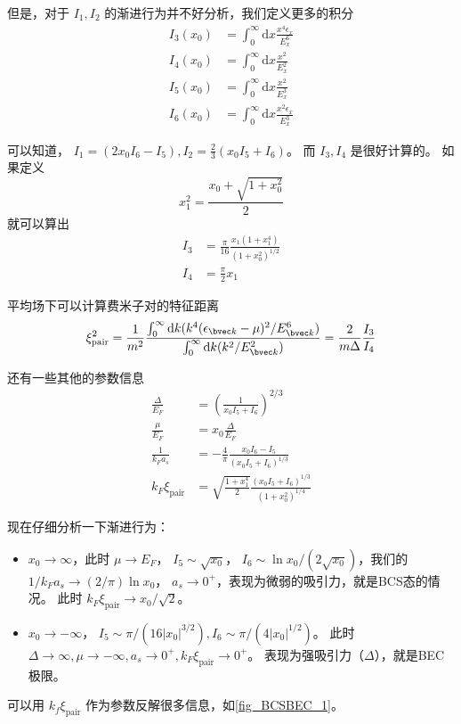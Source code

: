 但是，对于 $I_1, I_2$ 的渐进行为并不好分析，我们定义更多的积分
\begin{equation}
\begin{aligned}
I_3(x_0) &=\int_0^\infty\text{d}x\frac{x^4\epsilon_x}{E_x^6}\\
I_4(x_0) &=\int_0^\infty\text{d}x\frac{x^2}{E_x^2}\\
I_5(x_0) &=\int_0^\infty\text{d}x\frac{x^2}{E_x^3}\\
I_6(x_0) &=\int_0^\infty\text{d}x\frac{x^2\epsilon_x}{E_x^3}
\end{aligned}
\end{equation}

可以知道， $I_1=(2x_0I_6-I_5),I_2 = \frac{2}{3}(x_0I_5+I_6)$。 而 $I_3,I_4$ 是很好计算的。 如果定义
\begin{equation}
x_1^2=\frac{x_0+\sqrt{1+x_0^2}}{2}
\end{equation}
就可以算出
\begin{equation}
\begin{aligned}
I_3&=\frac{\pi}{16}\frac{x_1(1+x_1^4)}{(1+x_0^2)^{1/2}}\\
I_4&=\frac{\pi}{2}x_1
\end{aligned}
\end{equation}

平均场下可以计算费米子对的特征距离
\begin{equation}
\xi_{\text{pair}}^2 = \frac{1}{m^2}\frac{\int_0^\infty\text{d}k(k^4(\epsilon_{\bvec k}-\mu)^2/E_{\bvec k}^6)}{\int_0^\infty\text{d}k(k^2/E_{\bvec k}^2)} = \frac{2}{m\Delta}\frac{I_3}{I_4}
\end{equation}

还有一些其他的参数信息
\begin{equation}
\begin{aligned}
\frac{\Delta}{E_F} &= \left(\frac{1}{x_0I_5+I_6}\right)^{2/3}\\
\frac{\mu}{E_F} &= x_0\frac{\Delta}{E_F} \\
\frac{1}{k_Fa_s} &= -\frac{4}{\pi}\frac{x_0I_6-I_5}{(x_0I_5+I_6)^{1/3}}\\
k_F\xi_{\text{pair}} &= \sqrt{\frac{1+x_1^4}{2}}\frac{(x_0I_5+I_6)^{1/3}}{(1+x_0^2)^{1/4}}
\end{aligned}
\end{equation}

现在仔细分析一下渐进行为：

\begin{itemize}
\item $x_0\to\infty$，此时 $\mu\to E_F$， $I_5\sim\sqrt{x_0}$， $I_6\sim\ln x_0/(2\sqrt{x_0})$，我们的 $1/k_Fa_s\to(2/\pi)\ln x_0$， $a_s\to0^+$，表现为微弱的吸引力，就是BCS态的情况。 此时 $k_F\xi_{\text{pair}}\to x_0/\sqrt2$。
\item $x_0\to-\infty$， $I_5\sim\pi/(16|x_0|^{3/2}), I_6\sim\pi/(4|x_0|^{1/2})$。 此时 $\Delta\to\infty, \mu\to-\infty, a_s\to0^+,k_F\xi_{\text{pair}}\to0^+$。 表现为强吸引力（$\Delta$），就是BEC极限。
\end{itemize}

可以用 $k_f\xi_{\text{pair}}$ 作为参数反解很多信息，如\autoref{fig_BCSBEC_1}。


